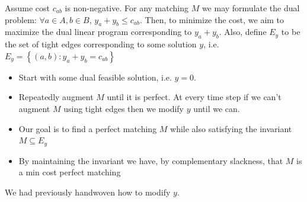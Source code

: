 \documentclass[../notes.tex]{subfiles}
\begin{document}
\begin{blockquote}
    Assume cost $ c_{ab} $ is non-negative. For any matching $ M $ we may formulate the dual problem: $ \forall a \in A, b \in B $, $ y_a + y_b \le  c_{ab} $. Then, to minimize the cost, we aim to maximize the dual linear program corresponding to $ y_a + y_b $. Also, define $ E_y $ to be the set of tight edges corresponding to some solution $ y $, i.e. $ E_y = \left\{ (a,b): y_a + y_b = c_{ab} \right\}  $

\end{blockquote}

\begin{itemize}
    \item Start with some dual feasible solution, i.e. $ y =0  $. 
    \item Repeatedly augment $ M $ until it is perfect. At every time step if we can't augment $ M $ using tight edges then we modify $ y $ until we can.
    \item Our goal is to find a perfect matching $ M $ while also satisfying the invariant $ M \subseteq E_y $    \item By maintaining the invariant we have, by complementary slackness, that $ M $ is a min cost perfect matching
\end{itemize}

We had previously handwoven how to modify $ y $. 
\end{document}
